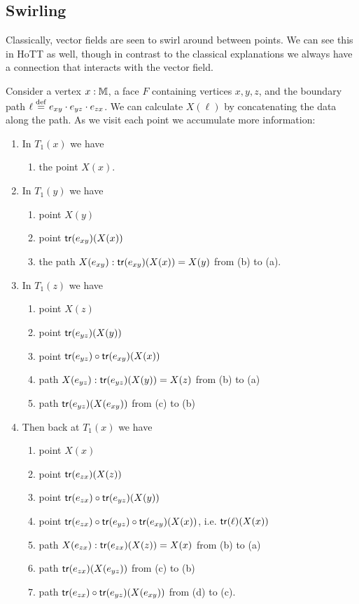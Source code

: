 \subsection{Swirling}

Classically, vector fields are seen to swirl around between points. We can see this in HoTT as well, though in contrast to the classical explanations we always have a connection that interacts with the vector field. 

Consider a vertex \( x:\mathbb{M} \), a face \( F \) containing vertices \( x, y, z \), and the boundary path \( \ell\stackrel{\mathrm{def}}{=} e_{xy}\cdot e_{yz} \cdot e_{zx} \). We can calculate \( X(\ell) \) by concatenating the data along the path. As we visit each point we accumulate more information:

\begin{enumerate}
\item In \( T_1(x) \) we have 
\begin{enumerate}
\item the point \( X(x) \).
\end{enumerate}
\item In \( T_1(y) \) we have
\begin{enumerate}
\item point \( X(y) \)
\item point \( \mathsf{tr}(e_{xy})(X(x)) \)
\item the path \( X(e_{xy}):\mathsf{tr}(e_{xy})(X(x))=X(y) \) from (b) to (a).
\end{enumerate}
\item In \( T_1(z) \) we have 
\begin{enumerate}
\item point \( X(z) \)
\item point \( \mathsf{tr}(e_{yz})(X(y)) \)
\item point \( \mathsf{tr}(e_{yz})\circ\mathsf{tr}(e_{xy})(X(x)) \)
\item path \( X(e_{yz}):\mathsf{tr}(e_{yz})(X(y))=X(z) \) from (b) to (a)
\item path \( \mathsf{tr}(e_{yz})(X(e_{xy})) \) from (c) to (b)
\end{enumerate}
\item Then back at \( T_1(x) \) we have
\begin{enumerate}
\item point \( X(x) \)
\item point \( \mathsf{tr}(e_{zx})(X(z)) \)
\item point \( \mathsf{tr}(e_{zx})\circ\mathsf{tr}(e_{yz})(X(y)) \)
\item point \( \mathsf{tr}(e_{zx})\circ\mathsf{tr}(e_{yz})\circ\mathsf{tr}(e_{xy})(X(x)) \), i.e. \( \mathsf{tr}(\ell)(X(x)) \)
\item path \( X(e_{zx}): \mathsf{tr}(e_{zx})(X(z))=X(x) \) from (b) to (a)
\item path \( \mathsf{tr}(e_{zx})(X(e_{yz})) \) from (c) to (b)
\item path \( \mathsf{tr}(e_{zx})\circ\mathsf{tr}(e_{yz})(X(e_{xy})) \) from (d) to (c).
\end{enumerate}
\end{enumerate}

